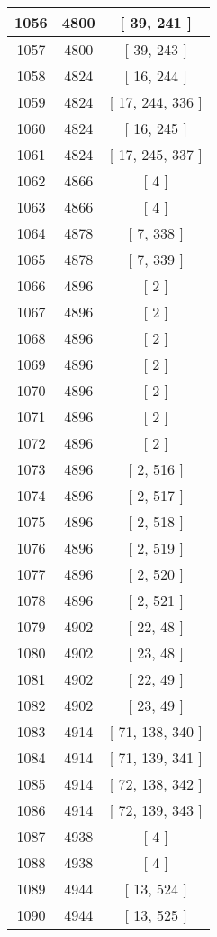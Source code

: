\begin{center}
\begin{longtable}[H]{|| c c c ||}
\hline
1056 & 4800 & [ 39, 241 ] \\ 
\hline
1057 & 4800 & [ 39, 243 ] \\ 
\hline
1058 & 4824 & [ 16, 244 ] \\ 
\hline
1059 & 4824 & [ 17, 244, 336 ] \\ 
\hline
1060 & 4824 & [ 16, 245 ] \\ 
\hline
1061 & 4824 & [ 17, 245, 337 ] \\ 
\hline
1062 & 4866 & [ 4 ] \\ 
\hline
1063 & 4866 & [ 4 ] \\ 
\hline
1064 & 4878 & [ 7, 338 ] \\ 
\hline
1065 & 4878 & [ 7, 339 ] \\ 
\hline
1066 & 4896 & [ 2 ] \\ 
\hline
1067 & 4896 & [ 2 ] \\ 
\hline
1068 & 4896 & [ 2 ] \\ 
\hline
1069 & 4896 & [ 2 ] \\ 
\hline
1070 & 4896 & [ 2 ] \\ 
\hline
1071 & 4896 & [ 2 ] \\ 
\hline
1072 & 4896 & [ 2 ] \\ 
\hline
1073 & 4896 & [ 2, 516 ] \\ 
\hline
1074 & 4896 & [ 2, 517 ] \\ 
\hline
1075 & 4896 & [ 2, 518 ] \\ 
\hline
1076 & 4896 & [ 2, 519 ] \\ 
\hline
1077 & 4896 & [ 2, 520 ] \\ 
\hline
1078 & 4896 & [ 2, 521 ] \\ 
\hline
1079 & 4902 & [ 22, 48 ] \\ 
\hline
1080 & 4902 & [ 23, 48 ] \\ 
\hline
1081 & 4902 & [ 22, 49 ] \\ 
\hline
1082 & 4902 & [ 23, 49 ] \\ 
\hline
1083 & 4914 & [ 71, 138, 340 ] \\ 
\hline
1084 & 4914 & [ 71, 139, 341 ] \\ 
\hline
1085 & 4914 & [ 72, 138, 342 ] \\ 
\hline
1086 & 4914 & [ 72, 139, 343 ] \\ 
\hline
1087 & 4938 & [ 4 ] \\ 
\hline
1088 & 4938 & [ 4 ] \\ 
\hline
1089 & 4944 & [ 13, 524 ] \\ 
\hline
1090 & 4944 & [ 13, 525 ] \\ 

\end{longtable}
\end{center}
